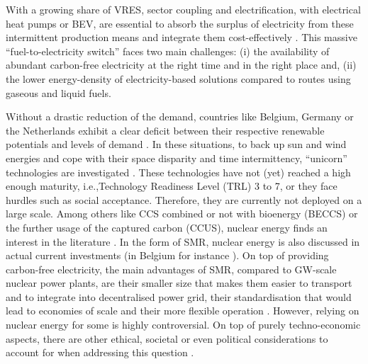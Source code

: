 \documentclass[11pt,twoside,a4paper,english]{article}
\def\ie{i.e.,}
\begin{document}
With a growing share of \gls{VRES}, sector coupling and electrification, with electrical heat pumps or \gls{BEV}, are essential to absorb the surplus of electricity from these intermittent production means \cite{robinius2017linking} and integrate them cost-effectively \cite{brown2018response, limpensECOS2021}. This massive ``fuel-to-electricity switch'' faces two main challenges: (i) the availability of abundant carbon-free electricity at the right time and in the right place and,  (ii) the lower energy-density of electricity-based solutions compared to routes using gaseous and liquid fuels. 

Without a drastic reduction of the demand, countries like Belgium, Germany or the Netherlands exhibit a clear deficit between their respective renewable potentials and levels of demand \cite{thiran2024exploring}. In these situations, to back up sun and wind energies and cope with their space disparity and time intermittency, ``unicorn'' technologies are investigated \cite{heuberger2018impact}. These technologies have not (yet) reached a high enough maturity, \ie Technology Readiness Level (TRL) 3 to 7, or they face hurdles such as social acceptance. Therefore, they are currently not deployed on a large scale. Among others like \gls{CCS} combined or not with bioenergy (BECCS) or the further usage of the captured carbon (CCUS), nuclear energy finds an interest in the literature \cite{IEA_Nuclear_2022,PATHS2050}. In the form of \acrfull{SMR}, nuclear energy is also discussed in actual current investments (in Belgium for instance \cite{SMRlesoir}).  On top of providing carbon-free electricity, the main advantages of \gls{SMR}, compared to GW-scale nuclear power plants, are their smaller size that makes them easier to transport and to integrate into decentralised power grid, their standardisation that would lead to economies of scale and their more flexible operation \cite{lloyd2021transport}. However, relying on nuclear energy for some is highly controversial. On top of purely techno-economic aspects, there are other ethical, societal or even political considerations to account for when addressing this question \cite{kempf2022}. 
\end{document}

